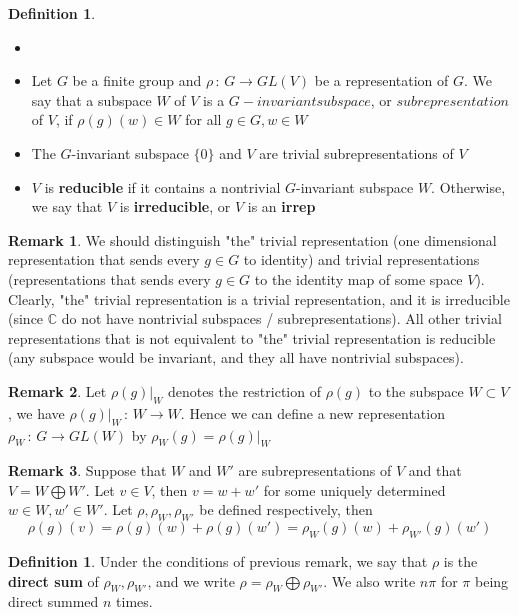 \documentclass{book}
\newcommand{\C}{\mathbb{C}}
\newcommand{\define}[1]{\textbf{#1}}
\theoremstyle{definition}
\newtheorem{definition}[lemma]{Definition}
\theoremstyle{remarkstyle}
\newtheorem*{remark}{Remark}%
\begin{document}
\begin{definition}
\begin{itemize}
    \item[]
    \item Let $G$ be a finite group and $\rho\,:\,G\rightarrow GL(V)$ be a representation of $G$. We say that a subspace $W$ of $V$ is a $G-invariant subspace$, or $subrepresentation$ of $V$, if $\rho(g)(w)\in W$ for all $g\in G, w\in W$
    \item The $G$-invariant subspace $\{0\}$ and $V$ are trivial subrepresentations of $V$
    \item $V$ is \define{reducible} if it contains a nontrivial $G$-invariant subspace $W$. Otherwise, we say that $V$ is \define{irreducible}, or $V$ is an \define{irrep}
\end{itemize}
\end{definition}
\begin{remark}
    We should distinguish "the" trivial representation (one dimensional representation that sends every $g\in G$ to identity) and trivial representations (representations that sends every $g\in G$ to the identity map of some space $V$). Clearly, "the" trivial representation is a trivial representation, and it is irreducible (since $\C$ do not have nontrivial subspaces / subrepresentations). All other trivial representations that is not equivalent to "the" trivial representation is reducible (any subspace would be invariant, and they all have nontrivial subspaces).
\end{remark}
\begin{remark}
    Let $\rho(g)\rvert_W$ denotes the restriction of $\rho(g)$ to the subspace $W\subset V$, we have $\rho(g)\rvert_W\,:\,W\rightarrow W$. Hence we can define a new representation $\rho_W\,:\, G\rightarrow GL(W)$ by $\rho_W(g)=\rho(g)\rvert_W$
\end{remark}
\begin{remark}
    Suppose that $W$ and $W'$ are subrepresentations of $V$ and that $V=W \bigoplus W'$. Let $v\in V$, then $v=w+w'$ for some uniquely determined $w\in W, w'\in W'$. Let $\rho, \rho_W, \rho_{W'} $ be defined respectively, then
    $$
    \rho(g)(v) = \rho(g)(w)+\rho(g)(w') = \rho_W(g)(w) + \rho_{W'}(g)(w')
    $$
    \newline
\end{remark}

\begin{definition}
    Under the conditions of previous remark, we say that $\rho$ is the \define{direct sum} of $\rho_W, \rho_{W'} $, and we write $\rho = \rho_W \bigoplus \rho_{W'} $. We also write $n\pi$ for $\pi$ being direct summed $n$ times. \newline
\end{definition}
\end{document}
